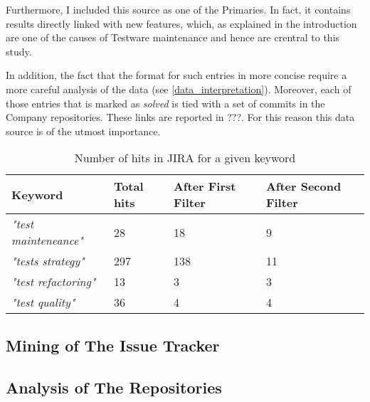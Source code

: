 Furthermore, I included this source as one of the Primaries. In fact, it contains results directly linked with new features, which, as explained in the introduction are one of the causes of Testware maintenance and hence are crentral to this study.

In addition, the fact that the format for such entries in more concise require a more careful analysis of the data (see \ref{data_interpretation}). Moreover, each of those entries that is marked as \textit{solved} is tied with a set of commits in the Company repositories. These links are reported in ???. For this reason this data source is of the utmost importance.


		\begin{table}[htb]
			\centering
			\caption{Number of hits in JIRA for a given keyword}
			\label{tab:confluence_results}
			\begin{tabulary}{\textwidth}{|L|L|L|L|}
				\hline
				\textbf{Keyword} & 
				\textbf{Total hits} &
				\textbf{After First Filter} &
				\textbf{After Second Filter}\\ \hline
				
				\textit{"test mainteneance"} &
				28 &
				18 &
				9 \\ \hline
				
				\textit{"tests strategy"} &
				297 &
				138 &
				11 \\ \hline
				
				\textit{"test refactoring"} &
				13 &
				3 &
				3 \\ \hline
				
				\textit{"test quality"} &
				36 &
				4 &
				4 \\ \hline
				

			\end{tabulary}		
		\end{table}

\subsection{Mining of The Issue Tracker}





\subsection{Analysis of The Repositories}

